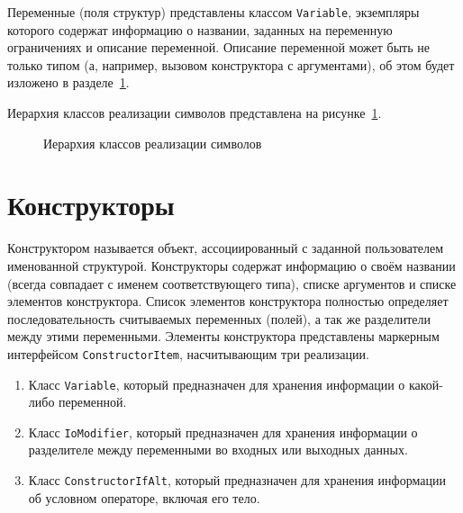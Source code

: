 \documentclass[times,specification,annotation]{style/itmo-student-thesis/itmo-student-thesis}
\begin{document}
Переменные (поля структур) представлены классом \texttt{Variable}, экземпляры которого содержат информацию о названии, заданных на переменную ограничениях и описание переменной. Описание переменной может быть не только типом (а, например, вызовом конструктора с аргументами), об этом будет изложено в разделе~\ref{constructors-section}.

Иерархия классов реализации символов представлена на рисунке~\ref{symbol-classes-hierarchy}.

\begin{figure}[!h]
\caption{Иерархия классов реализации символов}\label{symbol-classes-hierarchy}
\centering
{}%

\end{figure}

\section{Конструкторы}\label{constructors-section}

Конструктором называется объект, ассоциированный с заданной пользователем именованной структурой. Конструкторы содержат информацию о своём названии (всегда совпадает с именем соответствующего типа), списке аргументов и списке элементов конструктора. Список элементов конструктора полностью определяет последовательность считываемых переменных (полей), а так же разделители между этими переменными. Элементы конструктора представлены маркерным интерфейсом \texttt{ConstructorItem}, насчитывающим три реализации.

\begin{enumerate}[leftmargin=1.75cm]
    \item Класс \texttt{Variable}, который предназначен для хранения информации о какой-либо переменной.
    \item Класс \texttt{IoModifier}, который предназначен для хранения информации о разделителе между переменными во входных или выходных данных.
    \item Класс \texttt{ConstructorIfAlt}, который предназначен для хранения информации об условном операторе, включая его тело.
\end{enumerate}
\end{document}
